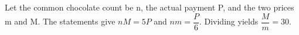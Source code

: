 Let the common chocolate count be n, the actual payment P, and the two prices m and M. The statements give $nM=5P$ and $nm=\dfrac{P}{6}$. Dividing yields $\dfrac{M}{m}=\boxed{30}$.
